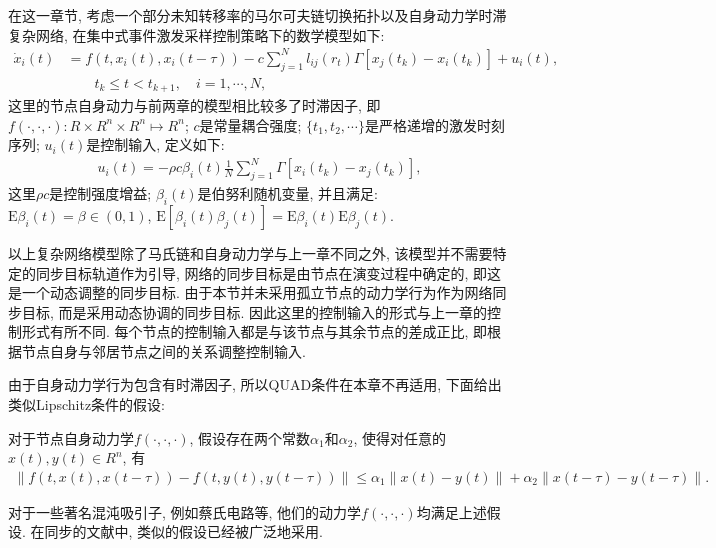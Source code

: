         在这一章节, 考虑一个部分未知转移率的马尔可夫链切换拓扑以及自身动力学时滞复杂网络, 在集中式事件激发采样控制策略下的数学模型如下:
        \begin{align}\label{sys:cen}
           \nonumber \dot{x}_{i}(t)&=f(t,x_{i}(t),x_i(t-\tau))-c\sum^N_{j=1}l_{ij}(r_{t})\Gamma[x_{j}(t_k)-x_{i}(t_{k})]+u_i(t),\\
            &\quad\quad t_{k}\leq t< t_{k+1}, \quad i = 1,\cdots,N,
        \end{align}
        这里的节点自身动力与前两章的模型相比较多了时滞因子, 即$f(\cdot,\cdot,\cdot): R\times R^n\times  R^n\mapsto  R^n$; $c$是常量耦合强度;
        $\{t_{1},t_{2},\cdots \}$是严格递增的激发时刻序列;
        $u_i(t)$是控制输入, 定义如下:
        \begin{align}\label{control}
            u_i(t)=-\rho c\beta_{i}(t)\frac{1}{N}\sum_{j=1}^N\Gamma[x_{i}(t_{k})-x_j(t_{k})],
        \end{align}
        这里$\rho c$是控制强度增益; $\beta_{i}(t)$是伯努利随机变量, 并且满足: $\mathrm{E}\beta_{i}(t)=\beta\in(0,1)$, $\mathrm{E}[\beta_{i}(t)\beta_{j}(t)]=\mathrm{E}\beta_{i}(t)\mathrm{E}\beta_{j}(t)$.
        \begin{rem}
            以上复杂网络模型除了马氏链和自身动力学与上一章不同之外, 该模型并不需要特定的同步目标轨道作为引导, 网络的同步目标是由节点在演变过程中确定的, 即这是一个动态调整的同步目标. 由于本节并未采用孤立节点的动力学行为作为网络同步目标, 而是采用动态协调的同步目标. 因此这里的控制输入的形式与上一章的控制形式有所不同. 每个节点的控制输入都是与该节点与其余节点的差成正比, 即根据节点自身与邻居节点之间的关系调整控制输入.
        \end{rem}

        由于自身动力学行为包含有时滞因子, 所以QUAD条件在本章不再适用, 下面给出类似Lipschitz条件的假设:
        \begin{hyp}{\rm{}}\label{ass1}
            对于节点自身动力学$f(\cdot,\cdot,\cdot)$, 假设存在两个常数$\alpha_1$和$\alpha_2$, 使得对任意的$x(t), y(t)\in R^n$, 有
         \begin{align*}
        \|f(t,x(t),x(t-\tau))-f(t,y(t),y(t-\tau))\|
        \leq\alpha_1\|x(t)-y(t)\|+\alpha_2\|x(t-\tau)-y(t-\tau)\|.
        \end{align*}
        \end{hyp}
    对于一些著名混沌吸引子, 例如蔡氏电路等, 他们的动力学$f(\cdot,\cdot,\cdot)$均满足上述假设. 在同步的文献中, 类似的假设已经被广泛地采用.

